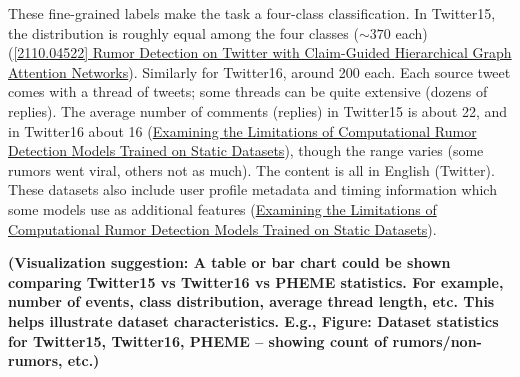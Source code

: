 \documentclass[12pt,a4paper]{report}
\begin{document}
These fine-grained labels make the task a four-class classification. In Twitter15, the distribution is roughly equal among the four classes (\(\sim370\) each) (\href{https://ar5iv.org/pdf/2110.04522#:~:text=real,rumor.%20To%20evaluate}{[2110.04522] Rumor Detection on Twitter with Claim-Guided Hierarchical Graph Attention Networks}). Similarly for Twitter16, around 200 each. Each source tweet comes with a thread of tweets; some threads can be quite extensive (dozens of replies). The average number of comments (replies) in Twitter15 is about 22, and in Twitter16 about 16 (\href{https://arxiv.org/html/2309.11576v2#:~:text=Average%20length%20of%20posts%2019,%E2%9C%93}{Examining the Limitations of Computational Rumor Detection Models Trained on Static Datasets}), though the range varies (some rumors went viral, others not as much). The content is all in English (Twitter). These datasets also include user profile metadata and timing information which some models use as additional features (\href{https://arxiv.org/html/2309.11576v2#:~:text=Average%20length%20of%20comments%20242,features%20obtained%20from%20each%20dataset}{Examining the Limitations of Computational Rumor Detection Models Trained on Static Datasets}).

\textbf{(Visualization suggestion: A table or bar chart could be shown comparing Twitter15 vs Twitter16 vs PHEME statistics. For example, number of events, class distribution, average thread length, etc. This helps illustrate dataset characteristics. E.g., Figure: Dataset statistics for Twitter15, Twitter16, PHEME – showing count of rumors/non-rumors, etc.)}
\end{document}

